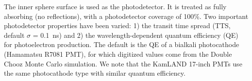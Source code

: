 \documentclass[aps,prc,twocolumn,groupedaddress,showpacs,amsmath,amssymb,floatfix,superscriptaddress]{revtex4}
\begin{document}
The inner sphere surface is used as the photodetector. It is treated
as fully absorbing (no reflections), with a photodetector coverage of
100\%. Two important photodetector properties have been varied: 1)
the transit time spread (TTS, default $\sigma$ = 0.1~ns) and 2) the
wavelength-dependent quantum efficiency (QE) for photoelectron
production. The default is the QE of a bialkali photocathode (Hamamatsu
R7081 PMT)\cite{Hamamatsu_R7081}, for which digitized values come from the Double Chooz \cite{dctwo}
Monte Carlo simulation. We note that the KamLAND 17-inch PMTs use the
same photocathode type with similar quantum efficiency.

\begin{figure}[tbh]
\begin{center}

\end{center}
\end{figure}
\end{document}
